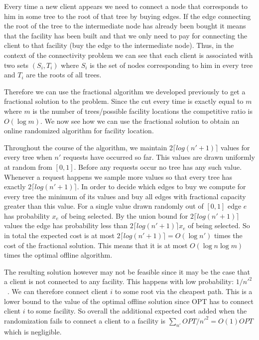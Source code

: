 Every time a new client appears we need to connect a node that corresponds to him in some tree to the root of that tree by buying edges. If the edge connecting the root of the tree to the intermediate node has already been bought it means that the facility has been built and that we only need to pay for connecting the client to that facility (buy the edge to the intermediate node). Thus, in the context of the connectivity problem we can see that each client is associated with two sets $(S_i,T_i)$ where $S_i$ is the set of nodes corresponding to him in every tree and $T_i$ are the roots of all trees.

Therefore we can use the fractional algorithm we developed previously to get a fractional solution to the problem. Since the cut every time is exactly equal to $m$ where $m$ is the number of trees/possible facility locations the competitive ratio is $O(\log m)$. We now see how we can use the fractional solution to obtain an online randomized algorithm for facility location.

Throughout the course of the algorithm, we maintain $2 \lceil log(n'+1) \rceil$ values for every tree when $n'$ requests have occurred so far. This values are drawn uniformly at random from $[0,1]$. Before any requests occur no tree has any such value. Whenever a request happens we sample more values so that every tree has exactly $2 \lceil log(n'+1) \rceil$. In order to decide which edges to buy we compute for every tree the minimum of its values and buy all edges with fractional capacity greater than this value. For a single value drawn randomly out of $[0,1]$ edge $e$ has probability $x_e$ of being selected. By the union bound for $2 \lceil log(n'+1) \rceil$ values the edge has probability less than $2 \lceil log(n'+1) \rceil x_e$ of being selected. So in total the expected cost is at most $2 \lceil log(n'+1) \rceil = O(\log n')$ times the cost of the fractional solution. This means that it is at most $O(\log n \log m)$ times the optimal offline algorithm.

The resulting solution however may not be feasible since it may be the case that a client is not connected to any facility.
This happens with low probability: $1/n'^{2}$~\cite{naor11:node-weighted-steiner-tree}.
We can therefore connect client $i$ to some root via the cheapest path. This is a lower bound to the value of the optimal offline solution since OPT has to connect client $i$ to some facility. So overall the additional expected cost added when the randomization fails to connect a client to a facility is $\sum_{n'} OPT/n'^2 = O(1) OPT$ which is negligible.

